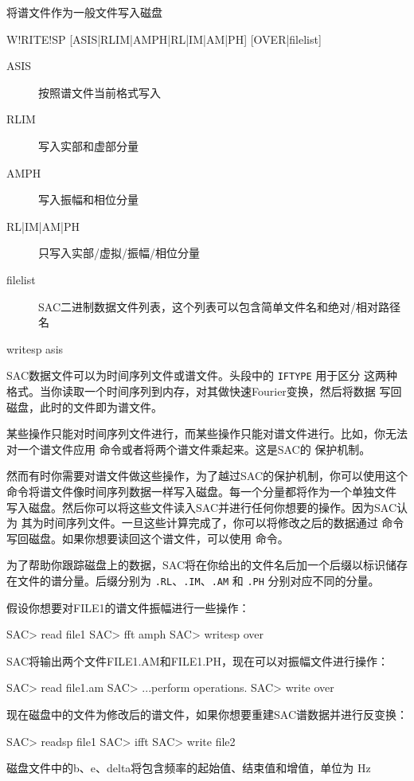\label{cmd:writesp}

将谱文件作为一般文件写入磁盘

\begin{SACSTX}
W!RITE!SP [ASIS|RLIM|AMPH|RL|IM|AM|PH] [OVER|filelist]
\end{SACSTX}

\begin{description}
\item [ASIS] 按照谱文件当前格式写入
\item [RLIM] 写入实部和虚部分量
\item [AMPH] 写入振幅和相位分量
\item [RL|IM|AM|PH] 只写入实部/虚拟/振幅/相位分量
\item [filelist]  SAC二进制数据文件列表，这个列表可以包含简单文件名和绝对/相对路径名
\end{description}

\begin{SACDFT}
writesp asis
\end{SACDFT}

SAC数据文件可以为时间序列文件或谱文件。头段中的 \texttt{IFTYPE} 用于区分
这两种格式。当你读取一个时间序列到内存，对其做快速Fourier变换，然后将数据
写回磁盘，此时的文件即为谱文件。

某些操作只能对时间序列文件进行，而某些操作只能对谱文件进行。比如，你无法
对一个谱文件应用  命令或者将两个谱文件乘起来。这是SAC的
保护机制。

然而有时你需要对谱文件做这些操作，为了越过SAC的保护机制，你可以使用这个
命令将谱文件像时间序列数据一样写入磁盘。每一个分量都将作为一个单独文件
写入磁盘。然后你可以将这些文件读入SAC并进行任何你想要的操作。因为SAC认为
其为时间序列文件。一旦这些计算完成了，你可以将修改之后的数据通过
 命令写回磁盘。如果你想要读回这个谱文件，可以使用
 命令。

为了帮助你跟踪磁盘上的数据，SAC将在你给出的文件名后加一个后缀以标识储存
在文件的谱分量。后缀分别为 \texttt{.RL}、\texttt{.IM}、\texttt{.AM} 和
\texttt{.PH} 分别对应不同的分量。

假设你想要对FILE1的谱文件振幅进行一些操作：
\begin{SACCode}
SAC> read file1
SAC> fft amph
SAC> writesp over
\end{SACCode}

SAC将输出两个文件FILE1.AM和FILE1.PH，现在可以对振幅文件进行操作：
\begin{SACCode}
SAC> read file1.am
SAC> ...perform operations.
SAC> write over
\end{SACCode}

现在磁盘中的文件为修改后的谱文件，如果你想要重建SAC谱数据并进行反变换：
\begin{SACCode}
SAC> readsp file1
SAC> ifft
SAC> write file2
\end{SACCode}

磁盘文件中的b、e、delta将包含频率的起始值、结束值和增值，单位为 \si{Hz}
